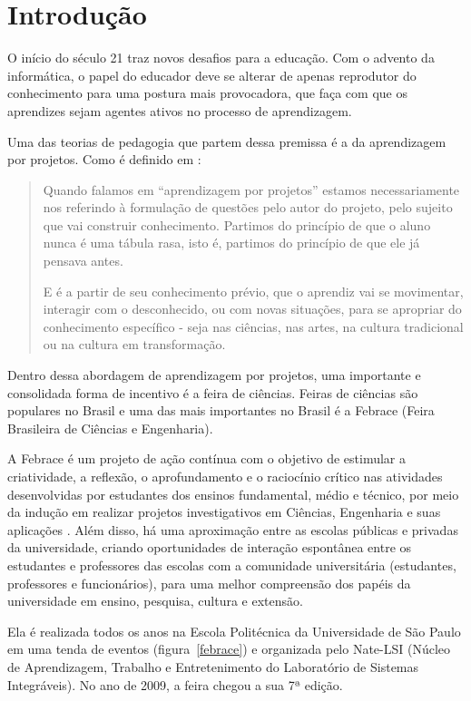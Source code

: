 
\chapter{Introdução}

O início do século 21 traz novos desafios para a educação. Com o advento da informática, o papel do educador deve se alterar de apenas reprodutor do conhecimento para uma postura mais provocadora, que faça com que os aprendizes sejam agentes ativos no processo de aprendizagem. 

Uma das teorias de pedagogia que partem dessa premissa é a da aprendizagem por projetos. Como é definido em :

\begin{quotation}
    Quando falamos em “aprendizagem por projetos” estamos necessariamente nos referindo à formulação de questões pelo autor do projeto, pelo sujeito que vai construir conhecimento. Partimos do princípio de que o aluno nunca é uma tábula rasa, isto é, partimos do princípio de que ele já pensava antes.

    E é a partir de seu conhecimento prévio, que o aprendiz vai se movimentar, interagir com o desconhecido, ou com novas situações, para se apropriar do conhecimento específico - seja nas ciências, nas artes, na cultura tradicional ou na cultura em transformação.
\end{quotation}

Dentro dessa abordagem de aprendizagem por projetos, uma importante e consolidada forma de incentivo é a feira de ciências. Feiras de ciências são populares no Brasil e uma das mais importantes no Brasil é a Febrace (Feira Brasileira de Ciências e Engenharia).

A Febrace é um projeto de ação contínua com o objetivo de estimular a criatividade, a reflexão, o aprofundamento e o raciocínio crítico nas atividades desenvolvidas por estudantes dos ensinos fundamental, médio e técnico, por meio da indução em realizar projetos investigativos em Ciências, Engenharia e suas aplicações \cite{lopes07}. Além disso, há uma aproximação entre as escolas públicas e privadas da universidade, criando oportunidades de interação espontânea entre os estudantes e professores das escolas com a comunidade universitária (estudantes, professores e funcionários), para uma melhor compreensão dos papéis da universidade em ensino, pesquisa, cultura e extensão. 

Ela é realizada todos os anos na Escola Politécnica da Universidade de São Paulo em uma tenda de eventos (figura~\ref{febrace}) e organizada pelo Nate-LSI (Núcleo de Aprendizagem, Trabalho e Entretenimento do Laboratório de Sistemas Integráveis). No ano de 2009, a feira chegou a sua 7ª edição.

